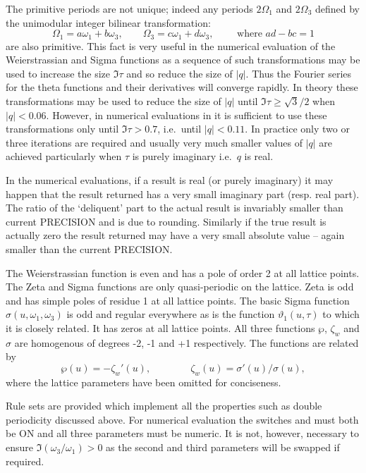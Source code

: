 The primitive periods are not unique;
indeed any periods $2\Omega_1$ and $2\Omega_3$ defined by the unimodular integer bilinear transformation:
\[\Omega_1 = a\omega_1 + b\omega_3,\qquad\Omega_3 = c\omega_1 + d\omega_3,\qquad\text{ where }ad-bc = 1\]
are also primitive. This fact is very useful in the numerical evaluation of the Weierstrassian and Sigma
functions as a sequence of such transformations may be used to increase the size $\Im \tau$ and so reduce
the size of $|q|$. Thus the Fourier series for the theta functions and their derivatives will converge rapidly.
In theory these transformations may be used to reduce the size of $|q|$ until $\Im \tau \geq \sqrt 3/2$ when
$|q|<0.06$. However, in numerical evaluations in \REDUCE it is sufficient to use these transformations only until
$\Im \tau > 0.7$, i.e.~until $|q| < 0.11$. In practice only two or three iterations are required
and usually very much smaller values of $|q|$ are achieved particularly when $\tau$ is purely imaginary i.e.~$q$ is real.

In the numerical evaluations, if a result is real (or purely imaginary) it may
happen that the result returned has a very small imaginary part
(resp. real part). The ratio of the `deliquent' part to the actual result is
invariably smaller than current PRECISION and is due to rounding. Similarly if
the true result is actually zero the result returned may have a very small
absolute value -- again smaller than the current PRECISION.

The Weierstrassian function is even and has a pole of order 2 at all lattice points.
The Zeta and Sigma functions are only quasi-periodic on the lattice. Zeta is odd and has simple poles of residue
1 at all lattice points. The basic Sigma function $\sigma(u,\omega_1,\omega_3)$ is odd and regular everywhere as is
the function $\vartheta_1(u,\tau)$ to which it is closely related. It has zeros at all lattice points. All three functions
$\wp$, $\zeta_w$ and $\sigma$ are homogenous of degrees -2, -1 and +1 respectively. The functions are related by
\[ \wp(u) = -\zeta_w'(u),\qquad\qquad \zeta_w(u) = \sigma'(u)/\sigma(u),\]
where the lattice parameters have been omitted for conciseness.

Rule sets are provided which implement all the properties such as double periodicity discussed above. For numerical evaluation
the switches  and  must both be ON and all three parameters must be numeric. It is not, however,
necessary to ensure $\Im(\omega_3/\omega_1) >0$ as the second and third parameters will be swapped if required.

